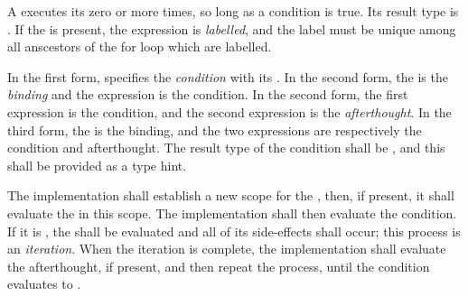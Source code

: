 \specsubsubitem
A  executes its  zero or more
times, so long as a condition is true. Its result type is .
If the  is present, the expression is \textit{labelled}, and
the label must be unique among all anscestors of the for loop which are
labelled.

\specsubsubitem
In the first form,  specifies the \textit{condition}
with its . In the second form, the
 is the \textit{binding} and the expression is the
condition. In the second form, the first expression is the condition, and the
second expression is the \textit{afterthought}. In the third form, the
 is the binding, and the two expressions are
respectively the condition and afterthought. The result type of the condition
shall be , and this shall be provided as a type hint.

\specsubsubitem
The implementation shall establish a new scope for the
, then, if present, it shall evaluate the
 in this scope. The implementation shall then evaluate the
condition. If it is , the  shall be
evaluated and all of its side-effects shall occur; this process is an
\textit{iteration}. When the iteration is complete, the implementation shall
evaluate the afterthought, if present, and then repeat the process, until the
condition evaluates to .


\begin{grammar}
 \\
	 \terminal{(}  \terminal{)} \terminal{\{}  \terminal{\}} \\

 \\
	 \optional{\terminal{,}} \\
	 \terminal{,}  \\

 \\
	 \terminal{=>}  \\
	\terminal{*} \terminal{=>}  \\

 \\
	 \optional{\terminal{,}} \\
	 \terminal{,}  \\
\end{grammar}

